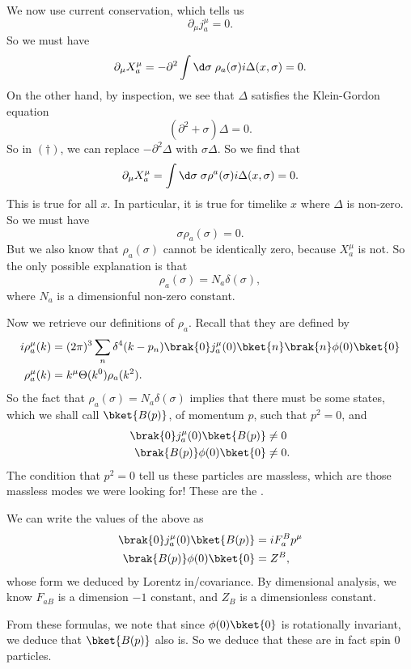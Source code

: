 \documentclass[a4paper]{article}
\begin{document}
We now use current conservation, which tells us
\[
  \partial_\mu j^\mu_a = 0.
\]
So we must have
\[
  \partial_\mu X_a^\mu =- \partial^2 \int \d \sigma\; \rho_a(\sigma) i \Delta(x, \sigma) = 0.
\]
On the other hand, by inspection, we see that $\Delta$ satisfies the Klein-Gordon equation
\[
  (\partial^2 + \sigma) \Delta = 0.
\]
So in $(\dagger)$, we can replace $-\partial^2 \Delta$ with $\sigma \Delta$. So we find that
\[
  \partial_\mu X_a^\mu = \int \d \sigma\; \sigma \rho^a (\sigma) i \Delta(x, \sigma) = 0.
\]
This is true for all $x$. In particular, it is true for timelike $x$ where $\Delta$ is non-zero. So we must have
\[
  \sigma \rho_a(\sigma) = 0.
\]
But we also know that $\rho_a(\sigma)$ cannot be identically zero, because $X_a^\mu$ is not. So the only possible explanation is that
\[
  \rho_a(\sigma) = N_a \delta(\sigma),
\]
where $N_a$ is a dimensionful non-zero constant.

Now we retrieve our definitions of $\rho_a$. Recall that they are defined by
\begin{align*}
  i \rho_a^\mu (k) &= (2\pi)^3 \sum_n \delta^4(k - p_n)\brak{0}j_a^\mu(0) \bket{n} \brak{n}\phi(0)\bket{0}\\
  \rho_a^\mu (k) &= k^\mu \Theta(k^0) \rho_a (k^2).
\end{align*}
So the fact that $\rho_a(\sigma) = N_a \delta(\sigma)$ implies that there must be some states, which we shall call $\bket{B(p)}$, of momentum $p$, such that $p^2 = 0$, and
\begin{align*}
  \brak{0}j_a^\mu(0)\bket{B(p)} &\not= 0\\
  \brak{B(p)} \phi(0) \bket{0} &\not= 0.
\end{align*}
The condition that $p^2 = 0$ tell us these particles are massless, which are those massless modes we were looking for! These are the .

We can write the values of the above as
\begin{align*}
  \brak{0} j_a^\mu (0)\bket{B(p)} &= i F_a^B p^\mu\\
  \brak{B(p)} \phi(0)\bket{0} &= Z^B,
\end{align*}
whose form we deduced by Lorentz in/covariance. By dimensional analysis, we know $F_{aB}$ is a dimension $-1$ constant, and $Z_B$ is a dimensionless constant.

From these formulas, we note that since $\phi(0)\bket{0}$ is rotationally invariant, we deduce that $\bket{B(p)}$ also is. So we deduce that these are in fact spin $0$ particles.
\end{document}
